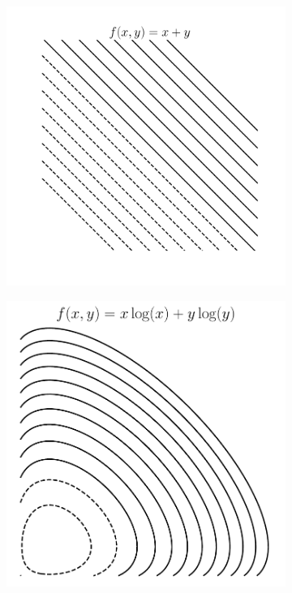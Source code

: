 \begin{figure}[t]
    \begin{subfigure}{0.325\textwidth}
        \includegraphics[height=1.02\linewidth]{ebookML_src/src/convexity/linear_2d.pdf}
        \caption{}
        \label{fig:16_contoursd}
    \end{subfigure}
    \begin{subfigure}{0.325\textwidth}
        \includegraphics[height=1.02\linewidth]{ebookML_src/src/convexity/NE.pdf}

\end{subfigure}
\end{figure}
